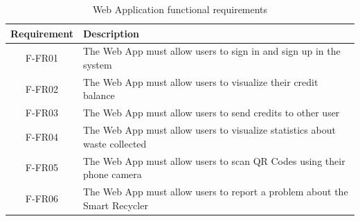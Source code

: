 \documentclass[a4paper,11pt]{article}
\begin{document}
\begin{table}[H]
  \caption{\small{Web Application functional requirements}}
  \begin{center}
    \begin{tabular}{|c|p{95mm}|}
      \hline
      Requirement & Description                                                                \\ \hline
      F-FR01      & The Web App must allow users to sign in and sign up in the system          \\ \hline
      F-FR02      & The Web App must allow users to visualize their credit balance             \\ \hline
      F-FR03      & The Web App must allow users to send credits to other user                 \\ \hline
      F-FR04      & The Web App must allow users to visualize statistics about waste collected \\ \hline
      F-FR05      & The Web App must allow users to scan QR Codes using their phone camera     \\ \hline
      F-FR06      & The Web App must allow users to report a problem about the Smart Recycler  \\ \hline
    \end{tabular}
  \end{center}
  \label{tab:app0}
\end{table}
\end{document}
